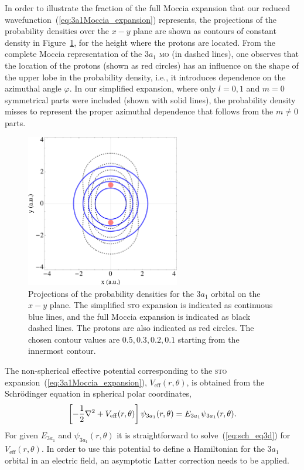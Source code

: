 In order to illustrate the fraction of the full Moccia expansion that
our reduced wavefunction~(\ref{eq:3a1Moccia_expansion}) represents,
the projections of the probability densities over the $x-y$ plane are
shown as contours of constant density in
Figure~\ref{fig:3a1_xycontours}, for the height where the protons are
located. From the complete Moccia representation of the $3a_{1}$
\textsc{mo} (in dashed lines), one observes that the location of the
protons (shown as red circles) has an influence on the shape of the
upper lobe in the probability density, i.e., it introduces dependence
on the azimuthal angle $\varphi$. In our simplified expansion, where
only $l=0,1$ and $m=0$ symmetrical parts were included (shown with
solid lines), the probability density misses to represent the proper
azimuthal dependence that follows from the $m\neq 0$ parts.

\begin{figure}
  \centering
  \includegraphics[width=0.6\textwidth]{figures/ch_H2O/3a1/orbitals3a1.eps}
  \caption{Projections of the probability densities for the $3a_{1}$
    orbital on the $x-y$ plane. The simplified \textsc{sto} expansion
    is indicated as continuous blue lines, and the full Moccia
    expansion is indicated as black dashed lines. The protons are also
    indicated as red circles. The chosen contour values are $0.5, 0.3,
    0.2, 0.1$ starting from the innermost contour.}
  \label{fig:3a1_xycontours}
\end{figure}

The non-spherical effective potential corresponding to the
\textsc{sto} expansion~(\ref{eq:3a1Moccia_expansion}),
$V_{\mathrm{eff}}(r,\theta)$, is obtained from the Schr\"{o}dinger
equation in spherical polar coordinates,
%
\begin{eqnarray}
  \left[ -\frac{1}{2} \nabla^{2} +
  V_{\rm{eff}}(r,\theta) \right] \psi_{3a_{1}}(r,\theta) =
  E_{3a_{1}} \psi_{3a_{1}}(r,\theta).
\label{eq:sch_eq3d}
\end{eqnarray}
%
For given $E_{3a_{1}}$ and $\psi_{3a_{1}}(r,\theta)$ it is
straightforward to solve~(\ref{eq:sch_eq3d}) for
$V_{\mathrm{eff}}(r,\theta)$. In order to use this potential to define
a Hamiltonian for the $3a_{1}$ orbital in an electric field, an
asymptotic Latter correction needs to be applied.

